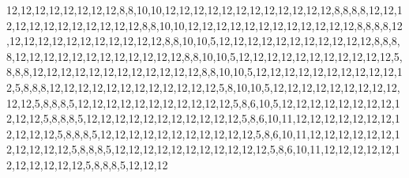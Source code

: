 12,12,12,12,12,12,12,12,8,8,10,10,12,12,12,12,12,12,12,12,12,12,12,12,8,8,8,8,12,12,12,12,12,12,12,12,12,12,12,12,8,8,10,10,12,12,12,12,12,12,12,12,12,12,12,12,8,8,8,8,12,12,12,12,12,12,12,12,12,12,12,12,8,8,10,10,5,12,12,12,12,12,12,12,12,12,12,12,8,8,8,8,12,12,12,12,12,12,12,12,12,12,12,12,8,8,10,10,5,12,12,12,12,12,12,12,12,12,12,12,5,8,8,8,12,12,12,12,12,12,12,12,12,12,12,12,8,8,10,10,5,12,12,12,12,12,12,12,12,12,12,12,5,8,8,8,12,12,12,12,12,12,12,12,12,12,12,12,5,8,10,10,5,12,12,12,12,12,12,12,12,12,12,12,5,8,8,8,5,12,12,12,12,12,12,12,12,12,12,12,5,8,6,10,5,12,12,12,12,12,12,12,12,12,12,12,5,8,8,8,5,12,12,12,12,12,12,12,12,12,12,12,5,8,6,10,11,12,12,12,12,12,12,12,12,12,12,12,5,8,8,8,5,12,12,12,12,12,12,12,12,12,12,12,5,8,6,10,11,12,12,12,12,12,12,12,12,12,12,12,5,8,8,8,5,12,12,12,12,12,12,12,12,12,12,12,5,8,6,10,11,12,12,12,12,12,12,12,12,12,12,12,5,8,8,8,5,12,12,12
